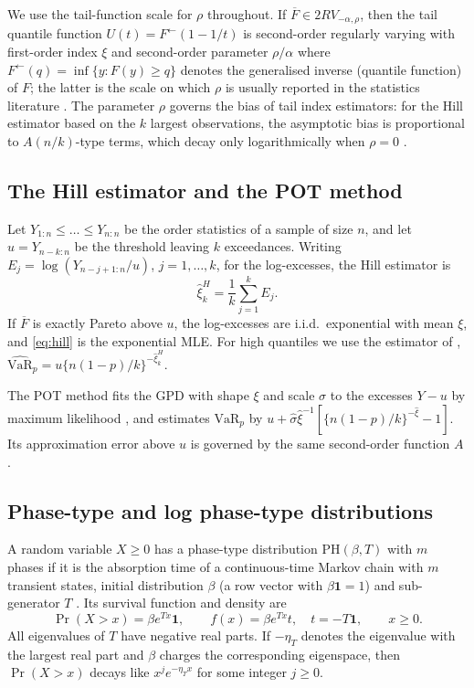 \documentclass[12pt]{article}
\theoremstyle{definition}
\theoremstyle{remark}
\newcommand{\bF}{\overline{F}}
\newcommand{\PH}{\mathrm{PH}}
\newcommand{\VaR}{\mathrm{VaR}}
\begin{document}
We use the tail-function scale for $\rho$ throughout. If $\bF\in 2RV_{-\alpha,\rho}$, then the tail quantile function $U(t)=F^{\leftarrow}(1-1/t)$ is second-order regularly varying with first-order index $\xi$ and second-order parameter $\rho/\alpha$ where $F^{\leftarrow}(q)=\inf\{y: F(y)\ge q\}$ denotes the generalised inverse (quantile function) of $F$; the latter is the scale on which $\rho$ is usually reported in the statistics literature \citep{DeHaanFerreira2006}. The parameter $\rho$ governs the bias of tail index estimators: for the Hill estimator based on the $k$ largest observations, the asymptotic bias is proportional to $A(n/k)$-type terms, which decay only logarithmically when $\rho=0$ \citep{Drees2000,Beirlant2004}.

\subsection{The Hill estimator and the POT method}

Let $Y_{1:n}\le\dots\le Y_{n:n}$ be the order statistics of a sample of size $n$, and let $u=Y_{n-k:n}$ be the threshold leaving $k$ exceedances. Writing $E_j=\log(Y_{n-j+1:n}/u)$, $j=1,\dots,k$, for the log-excesses, the Hill estimator is
\begin{equation}\label{eq:hill}
\hat\xi^{H}_k=\frac1k\sum_{j=1}^k E_j .
\end{equation}
If $\bF$ is exactly Pareto above $u$, the log-excesses are i.i.d.\ exponential with mean $\xi$, and \eqref{eq:hill} is the exponential MLE. For high quantiles we use the estimator of \citet{Weissman1978}, $\widehat{\VaR}_p=u\{n(1-p)/k\}^{-\hat\xi^H_k}$.

The POT method fits the GPD with shape $\xi$ and scale $\sigma$ to the excesses $Y-u$ by maximum likelihood \citep{Smith1987,McNeil1997}, and estimates $\VaR_p$ by $u+\hat\sigma\hat\xi^{-1}[\{n(1-p)/k\}^{-\hat\xi}-1]$. Its approximation error above $u$ is governed by the same second-order function $A$ \citep{DeHaanFerreira2006}.

\subsection{Phase-type and log phase-type distributions}

A random variable $X\ge0$ has a phase-type distribution $\PH(\beta,T)$ with $m$ phases if it is the absorption time of a continuous-time Markov chain with $m$ transient states, initial distribution $\beta$ (a row vector with $\beta\mathbf 1=1$) and sub-generator $T$ \citep{Neuts1981,BladtNielsen2017}. Its survival function and density are
\begin{equation}\label{eq:ph}
\Pr(X>x)=\beta e^{Tx}\mathbf 1,\qquad f(x)=\beta e^{Tx}t,\quad t=-T\mathbf 1,\qquad x\ge 0.
\end{equation}
All eigenvalues of $T$ have negative real parts. If $-\eta_T$ denotes the eigenvalue with the largest real part and $\beta$ charges the corresponding eigenspace, then $\Pr(X>x)$ decays like $x^{j}e^{-\eta_T x}$ for some integer $j\ge 0$.
\end{document}
